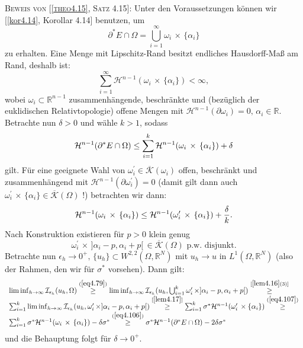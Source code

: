 \textsc{Beweis von [\ref{theo4.15}, Satz 4.15]:} Unter den Voraussetzungen können wir [\ref{kor4.14}, Korollar 4.14] benutzen, um 
\begin{equation}
    \partial^* E \cap \Omega = \bigcup_{i=1}^{\infty} \omega_i \, \times \, \{\alpha_i\}
\end{equation}
zu erhalten. Eine Menge mit Lipschitz-Rand besitzt endliches Hausdorff-Maß am Rand, deshalb ist:
\begin{equation}
    \sum_{i=1}^{\infty} \mathcal{H}^{n-1}(\omega_i \, \times \, \{\alpha_i\}) < \infty,
\end{equation}
wobei \(\omega_i \subset \mathbb{R}^{n-1}\) zusammenhängende, beschränkte und (bezüglich der euklidischen Relativtopologie) offene Mengen mit \(\mathcal{H}^{n-1}(\partial \omega_i) = 0, \, \alpha_i \in \mathbb{R}\). Betrachte nun \(\delta > 0\) und wähle \(k > 1\), sodass
\begin{equation}{\label{eq4.106}}
    \mathcal{H}^{n-1}(\partial^* E \cap \Omega) \leq \sum_{i=1}^k \mathcal{H}^{n-1}(\omega_i \, \times \, \{\alpha_i\}) + \delta
\end{equation}
gilt. Für eine geeignete Wahl von \(\omega_i^{\prime} \in \overline{\mathcal{K}}(\omega_i)\) offen, beschränkt und zusammenhängend mit \(\mathcal{H}^{n-1}(\partial \omega_i^{\prime}) = 0\) (damit gilt dann auch \(\omega_i^{\prime} \, \times \, \{\alpha_i\} \in \overline{\mathcal{K}}(\Omega)\) !) betrachten wir dann:
\begin{equation}{\label{eq4.107}}
    \mathcal{H}^{n-1}(\omega_i \, \times \, \{\alpha_i\}) \leq \mathcal{H}^{n-1}(\omega_i^{\prime} \, \times \, \{\alpha_i\}) + \frac{\delta}{k}.
\end{equation}
Nach Konstruktion existieren für \(p > 0\) klein genug
\begin{equation}
    \omega_i^{\prime} \, \times \, ]\alpha_i - p, \alpha_i + p[ \, \in \overline{\mathcal{K}}(\Omega) \text{ p.w. disjunkt}.
\end{equation}
Betrachte nun \(\epsilon_h \to 0^+, \, \{u_h\} \subset W^{2,2}(\Omega,\mathbb{R}^N)\) mit \(u_h \to u\) in \(L^1(\Omega,\mathbb{R}^N)\) (also der Rahmen, den wir für \(\sigma^*\) vorsehen). Dann gilt:
\begin{equation}
\begin{array}{l}
    \liminf_{h \to \infty} \mathcal{I}_{\epsilon_h}(u_h,\Omega) \stackrel{(\ref{eq4.79})}{\geq} \liminf_{h \to \infty} \mathcal{I}_{\epsilon_h}(u_h,\bigcup_{i=1}^k \omega_i^{\prime} \, \times ]\alpha_i - p,\alpha_i + p[) \stackrel{[\ref{lem4.16} (3)]}{\geq} \\
    \sum_{i=1}^k \liminf_{h \to \infty} \mathcal{I}_{\epsilon_h} (u_h, \omega_i^{\prime} \, \times ]\alpha_i - p, \alpha_i + p[) \stackrel{[\ref{lem4.17}]}{\geq} \sum_{i=1}^k \sigma^* \mathcal{H}^{n-1}(\omega_i^{\prime} \, \times \{\alpha_i\}) \stackrel{(\ref{eq4.107})}{\geq} \\
    \sum_{i=1}^k \sigma^* \mathcal{H}^{n-1}(\omega_i \, \times \, \{\alpha_i\}) - \delta \sigma^* \stackrel{(\ref{eq4.106})}{\geq} \sigma^* \mathcal{H}^{n-1}(\partial^* E \cap \Omega) - 2\delta \sigma^*
\end{array}
\end{equation}
und die Behauptung folgt für \(\delta \to 0^+\). \QEDB

